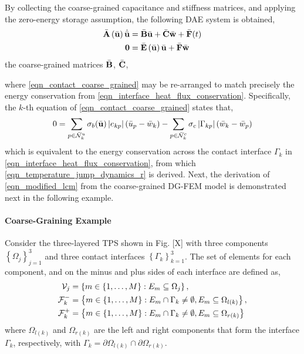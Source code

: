 By collecting the coarse-grained capacitance and stiffness matrices, and applying the zero-energy storage assumption, the following DAE system is obtained,
\begin{subequations}
    \begin{align}
        \bar{\mathbf{A}}\left(\bar{\mathbf{u}}\right)\dot{\bar{\mathbf{u}}} &= \bar{\mathbf{B}}\bar{\mathbf{u}} + \bar{\mathbf{C}}\bar{\mathbf{w}} + \bar{\mathbf{F}}(t)\label{eqn_bulk_coarse_grained}\\
        \mathbf{0} &= \bar{\mathbf{E}}\left(\bar{\mathbf{u}}\right)\bar{\mathbf{u}} + \bar{\mathbf{F}}\bar{\mathbf{w}}\label{eqn_contact_coarse_grained}
    \end{align}
\end{subequations}
the coarse-grained matrices $\bar{\mathbf{B}}$, $\bar{\mathbf{C}}$, 


where \cref{eqn_contact_coarse_grained} may be re-arranged to match precisely the energy conservation from \cref{eqn_interface_heat_flux_conservation}. Specifically, the $k$-th equation of \cref{eqn_contact_coarse_grained} states that,
\begin{equation}
    0 = \sum_{p\in\bar{\mathcal{N}}_k^u}\sigma_b(\bar{\mathbf{u}})\left|e_{kp}\right|\left(\bar{u}_p-\bar{w}_k\right) - \sum_{p\in\bar{\mathcal{N}}_k^c}\sigma_c\left|\Gamma_{kp}\right|\left(\bar{w}_k-\bar{w}_p\right)
\end{equation}
which is equivalent to the energy conservation across the contact interface $\Gamma_k$ in \cref{eqn_interface_heat_flux_conservation}, from which \cref{eqn_temperature_jump_dynamics_r} is derived. Next, the derivation of \cref{eqn_modified_lcm} from the coarse-grained DG-FEM model is demonstrated next in the following example.

\paragraph*{Coarse-Graining Example} Consider the three-layered TPS shown in Fig. [X] with three components $\left\{\Omega_j\right\}_{j=1}^3$ and three contact interfaces $\left\{\Gamma_k\right\}_{k=1}^3$. The set of elements for each component, and on the minus and plus sides of each interface are defined as,
\begin{subequations}
    \begin{align}
        \mathcal{V}_j &= \left\{m\in\{1,\ldots,M\}:E_m\subseteq\Omega_j\right\},\\
        \mathcal{F}_k^{-} &= \left\{m\in\{1,\ldots,M\}:E_m\cap\Gamma_k\neq\emptyset, E_m\subseteq\Omega_{l(k)}\right\},\\
        \mathcal{F}_k^{+} &= \left\{m\in\{1,\ldots,M\}:E_m\cap\Gamma_k\neq\emptyset, E_m\subseteq\Omega_{r(k)}\right\}
    \end{align}
\end{subequations}
where $\Omega_{l(k)}$ and $\Omega_{r(k)}$ are the left and right components that form the interface $\Gamma_k$, respectively, with $\Gamma_k = \partial\Omega_{l(k)}\cap\partial\Omega_{r(k)}$.

